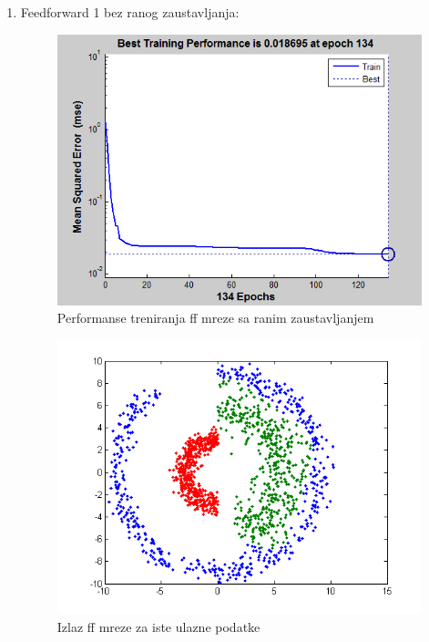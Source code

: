 \documentclass{report}
\begin{document}
\begin{enumerate}
\begin{enumerate}
\newpage
\item\LARGE
Feedforward 1 bez ranog zaustavljanja:\large

\begin{figure}[!h]
\begin{center}
\includegraphics[scale=0.8]{B1performanceFF1.png}
\caption{Performanse treniranja ff mreze sa ranim zaustavljanjem}
\end{center}
\end{figure}

\begin{figure}[!h]
\begin{center}
\includegraphics[scale=0.8]{B1outputFF1Same.png}
\caption{Izlaz ff mreze za iste ulazne podatke}
\end{center}
\end{figure}


\end{enumerate}
\end{enumerate}
\end{document}
